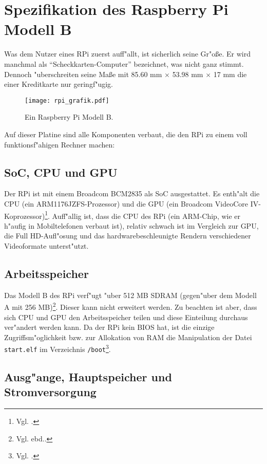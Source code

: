 \section{Spezifikation des Raspberry Pi Modell B}\label{RPi Spezifikation}

Was dem Nutzer eines RPi zuerst auff"allt, ist sicherlich seine Gr"o\ss e. Er wird manchmal als "`Scheckkarten-Computer"' bezeichnet, was nicht ganz stimmt. Dennoch "uberschreiten seine Ma\ss e mit 85.60 mm $\times$ 53.98 mm $\times$ 17 mm die einer Kreditkarte nur geringf"ugig. 
\begin{figure}[htb]
	\centering
	\texttt{[image: rpi\_grafik.pdf]}\\ 
	\caption{Ein Raspberry Pi Modell B\cite{scrguide01}.}\label{fig:RPi-Spezifikation}
\end{figure}

\noindent Auf dieser Platine sind alle Komponenten verbaut, die den RPi zu einem voll funktionsf"ahigen Rechner machen: 

\subsection{SoC, CPU und GPU}\label{RPi Hardware}

Der RPi ist mit einem Broadcom BCM2835 als SoC ausgestattet. Es enth"alt die CPU (ein ARM1176JZFS-Prozessor) und die GPU (ein Broadcom VideoCore IV-Koprozessor)\footnote{Vgl. \cite{scrguide02}.}. Auff"allig ist, dass die CPU des RPi (ein ARM-Chip, wie er h"aufig in Mobiltelefonen verbaut ist), relativ schwach ist im Vergleich zur GPU, die Full HD-Aufl"osung und das hardwarebeschleunigte Rendern verschiedener Videoformate unterst"utzt. 

\subsection{Arbeitsspeicher}\label{RPi RAM}
Das Modell B des RPi verf"ugt "uber 512 MB SDRAM (gegen"uber dem Modell A mit 256 MB)\footnote{Vgl. ebd..}. Dieser kann nicht erweitert werden. Zu beachten ist aber, dass sich CPU und GPU den Arbeitsspeicher teilen und diese Einteilung durchaus ver"andert werden kann. Da der RPi kein BIOS hat, ist die einzige Zugriffsm"oglichkeit bzw. zur Allokation von RAM die Manipulation der Datei \verb+start.elf+ im Verzeichnis \verb+/boot+\footnote{Vgl. \cite{pow12}.}.

\subsection{Ausg"ange, Hauptspeicher und Stromversorgung}\label{RPi Schnittstellen}


